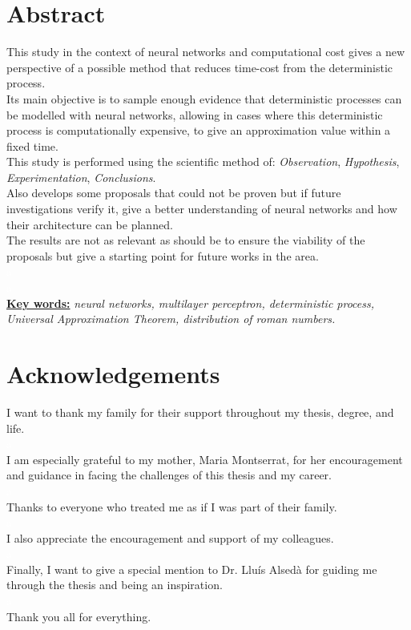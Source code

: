 \documentclass[a4paper, 11pt]{article}
\begin{document}
\section*{Abstract}
This study in the context of neural networks and computational cost gives a new perspective of a possible method that reduces time-cost from the deterministic process.\\
Its main objective is to sample enough evidence that deterministic processes can be modelled with neural networks, allowing in cases where this deterministic process is computationally expensive, to give an approximation value within a fixed time.\\
This study is performed using the scientific method of: \textit{Observation}, \textit{Hypothesis}, \textit{Experimentation}, \textit{Conclusions}.\\
Also develops some proposals that could not be proven but if future investigations verify it, give a better understanding of neural networks and how their architecture can be planned.\\
The results are not as relevant as should be to ensure the viability of the proposals but give a starting point for future works in the area.\\
\textcolor{white}{a}\\
\textcolor{white}{a}\\
\underline{\textbf{Key words:}} \textit{neural networks, multilayer perceptron, deterministic process, Universal Approximation Theorem, distribution of roman numbers.}

\newpage
\section*{Acknowledgements}
I want to thank my family for their support throughout my thesis, degree, and life.\\
\textcolor{white}{a}\\
I am especially grateful to my mother, Maria Montserrat, for her encouragement and guidance in facing the challenges of this thesis and my career.\\
\textcolor{white}{a}\\
Thanks to everyone who treated me as if I was part of their family.\\
\textcolor{white}{a}\\
I also appreciate the encouragement and support of my colleagues.\\
\textcolor{white}{a}\\
Finally, I want to give a special mention to Dr. Lluís Alsedà for guiding me through the thesis and being an inspiration.\\
\textcolor{white}{a}\\
Thank you all for everything.
\newpage
\end{document}

